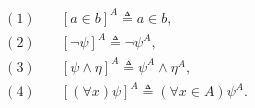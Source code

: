 \begin{align*}
(1)&\quad [a \in b]^A \triangleq a \in b,\\
(2)&\quad [\neg \psi]^A \triangleq \neg \psi^A,\\
(3)&\quad [\psi \wedge \eta]^A \triangleq \psi^A \wedge \eta^A,\\
(4)&\quad [(\forall x)\psi]^A \triangleq (\forall x \in A) \psi^A.
\end{align*}